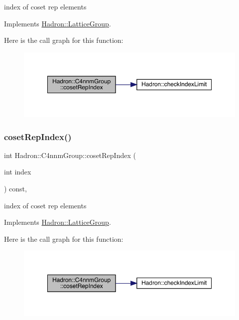 index of coset rep elements 

Implements \mbox{\hyperlink{structHadron_1_1LatticeGroup_a7e3b9b5e2f596e6c40d64aa939a3ad6c}{Hadron\+::\+Lattice\+Group}}.

Here is the call graph for this function\+:
\nopagebreak
\begin{figure}[H]
\begin{center}
\leavevmode
\includegraphics[width=350pt]{d1/dba/structHadron_1_1C4nnmGroup_a413031d9855013b22c493696c69a2c4d_cgraph}
\end{center}
\end{figure}
\mbox{\label{structHadron_1_1C4nnmGroup_a413031d9855013b22c493696c69a2c4d}} 
\subsubsection{\texorpdfstring{cosetRepIndex()}{cosetRepIndex()}\hspace{0.1cm}{\footnotesize\ttfamily [3/3]}}
{\footnotesize\ttfamily int Hadron\+::\+C4nnm\+Group\+::coset\+Rep\+Index (\begin{DoxyParamCaption}\item[{int}]{index }\end{DoxyParamCaption}) const\hspace{0.3cm}{\ttfamily [inline]}, {\ttfamily [virtual]}}

index of coset rep elements 

Implements \mbox{\hyperlink{structHadron_1_1LatticeGroup_a7e3b9b5e2f596e6c40d64aa939a3ad6c}{Hadron\+::\+Lattice\+Group}}.

Here is the call graph for this function\+:
\nopagebreak
\begin{figure}[H]
\begin{center}
\leavevmode
\includegraphics[width=350pt]{d1/dba/structHadron_1_1C4nnmGroup_a413031d9855013b22c493696c69a2c4d_cgraph}
\end{center}
\end{figure}
\mbox{\label{structHadron_1_1C4nnmGroup_ab40f44381ee83db2364e43bc2c3521e4}} 

